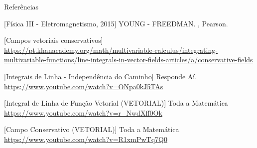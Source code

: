 \documentclass{beamer}
\begin{document}
\nocite{*}
\begin{frame}{Referências}
    \begin{thebibliography}{10}
        [Física III - Eletromagnetismo, 2015]
        YOUNG - FREEDMAN.
        ,
        \newblock Pearson.
        
        [Campos vetoriais conservativos]
        \newblock \url{https://pt.khanacademy.org/math/multivariable-calculus/integrating-multivariable-functions/line-integrals-in-vector-fields-articles/a/conservative-fields}
             
        [Integrais de Linha - Independência do Caminho]
        \newblock Responde Aí.
        \newblock \url{https://www.youtube.com/watch?v=ONpa0kJ5TAs}
             
        [Integral de Linha de Função Vetorial (VETORIAL)]
        \newblock Toda a Matemática
        \newblock \url{https://www.youtube.com/watch?v=r_NwdXff0Ok}

        [Campo Conservativo (VETORIAL)]
        \newblock Toda a Matemática
        \newblock \url{https://www.youtube.com/watch?v=R1xmPwTq7Q0}
        
    \end{thebibliography}
\end{frame}
\end{document}
